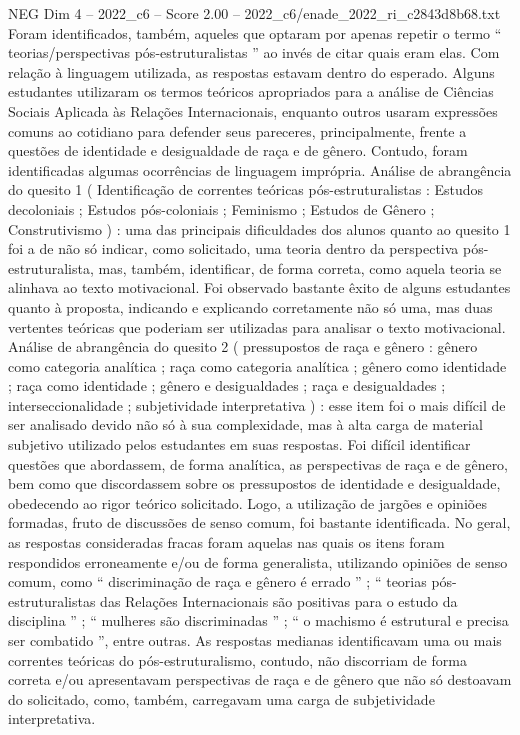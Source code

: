 \begin{textsample}{NEG Dim 4 – 2022\_c6 – Score 2.00 – 2022\_c6/enade\_2022\_ri\_c2843d8b68.txt}
Foram identificados, também, aqueles que optaram por apenas repetir o termo “ teorias/perspectivas pós-estruturalistas ” ao invés de citar quais eram elas.
Com relação à linguagem utilizada, as respostas estavam dentro do esperado.
Alguns estudantes utilizaram os termos teóricos apropriados para a análise de Ciências Sociais Aplicada às Relações Internacionais, enquanto outros usaram expressões comuns ao cotidiano para defender seus pareceres, principalmente, frente a questões de identidade e desigualdade de raça e de gênero.
Contudo, foram identificadas algumas ocorrências de linguagem imprópria.
Análise de abrangência do quesito 1 ( Identificação de correntes teóricas pós-estruturalistas : Estudos decoloniais ; Estudos pós-coloniais ; Feminismo ; Estudos de Gênero ; Construtivismo ) : uma das principais dificuldades dos alunos quanto ao quesito 1 foi a de não só indicar, como solicitado, uma teoria dentro da perspectiva pós-estruturalista, mas, também, identificar, de forma correta, como aquela teoria se alinhava ao texto motivacional.
Foi observado bastante êxito de alguns estudantes quanto à proposta, indicando e explicando corretamente não só uma, mas duas vertentes teóricas que poderiam ser utilizadas para analisar o texto motivacional.
Análise de abrangência do quesito 2 ( pressupostos de raça e gênero : gênero como categoria analítica ; raça como categoria analítica ; gênero como identidade ; raça como identidade ; gênero e desigualdades ; raça e desigualdades ; interseccionalidade ; subjetividade interpretativa ) : esse item foi o mais difícil de ser analisado devido não só à sua complexidade, mas à alta carga de material subjetivo utilizado pelos estudantes em suas respostas.
Foi difícil identificar questões que abordassem, de forma analítica, as perspectivas de raça e de gênero, bem como que discordassem sobre os pressupostos de identidade e desigualdade, obedecendo ao rigor teórico solicitado.
Logo, a utilização de jargões e opiniões formadas, fruto de discussões de senso comum, foi bastante identificada.
No geral, as respostas consideradas fracas foram aquelas nas quais os itens foram respondidos erroneamente e/ou de forma generalista, utilizando opiniões de senso comum, como “ discriminação de raça e gênero é errado ” ; “ teorias pós-estruturalistas das Relações Internacionais são positivas para o estudo da disciplina ” ; “ mulheres são discriminadas ” ; “ o machismo é estrutural e precisa ser combatido ”, entre outras.
As respostas medianas identificavam uma ou mais correntes teóricas do pós-estruturalismo, contudo, não discorriam de forma correta e/ou apresentavam perspectivas de raça e de gênero que não só destoavam do solicitado, como, também, carregavam uma carga de subjetividade interpretativa.

\end{textsample}
